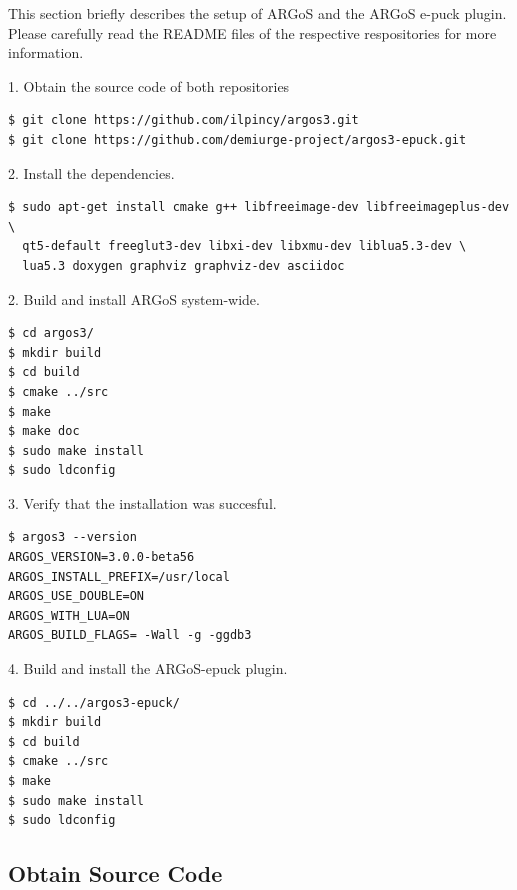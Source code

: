\documentclass{article}
\begin{document}
This section briefly describes the setup of ARGoS and the ARGoS e-puck
plugin. Please carefully read the README files of the respective
respositories for more information.

1. Obtain the source code of both repositories

\begin{verbatim}
$ git clone https://github.com/ilpincy/argos3.git
$ git clone https://github.com/demiurge-project/argos3-epuck.git
\end{verbatim}

2. Install the dependencies.

\begin{verbatim}
$ sudo apt-get install cmake g++ libfreeimage-dev libfreeimageplus-dev \
  qt5-default freeglut3-dev libxi-dev libxmu-dev liblua5.3-dev \
  lua5.3 doxygen graphviz graphviz-dev asciidoc
\end{verbatim}

2. Build and install ARGoS system-wide.
\begin{verbatim}
$ cd argos3/
$ mkdir build
$ cd build
$ cmake ../src
$ make
$ make doc
$ sudo make install
$ sudo ldconfig
\end{verbatim}

3. Verify that the installation was succesful.

\begin{verbatim}
$ argos3 --version
ARGOS_VERSION=3.0.0-beta56
ARGOS_INSTALL_PREFIX=/usr/local
ARGOS_USE_DOUBLE=ON
ARGOS_WITH_LUA=ON
ARGOS_BUILD_FLAGS= -Wall -g -ggdb3
\end{verbatim}

4. Build and install the ARGoS-epuck plugin.

\begin{verbatim}
$ cd ../../argos3-epuck/
$ mkdir build
$ cd build
$ cmake ../src
$ make
$ sudo make install
$ sudo ldconfig
\end{verbatim}

\subsection{Obtain Source Code}
\end{document}
